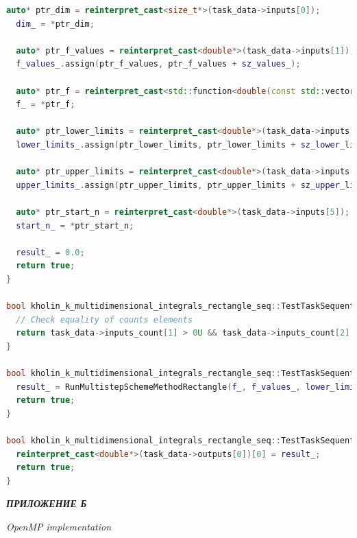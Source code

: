 \documentclass[14pt,a4paper]{article}
\begin{document}
\begin{framed}
\begin{lstlisting}[language=C++]
  auto* ptr_dim = reinterpret_cast<size_t*>(task_data->inputs[0]);
  dim_ = *ptr_dim;

  auto* ptr_f_values = reinterpret_cast<double*>(task_data->inputs[1]);
  f_values_.assign(ptr_f_values, ptr_f_values + sz_values_);

  auto* ptr_f = reinterpret_cast<std::function<double(const std::vector<double>&)>*>(task_data->inputs[2]);
  f_ = *ptr_f;

  auto* ptr_lower_limits = reinterpret_cast<double*>(task_data->inputs[3]);
  lower_limits_.assign(ptr_lower_limits, ptr_lower_limits + sz_lower_limits_);

  auto* ptr_upper_limits = reinterpret_cast<double*>(task_data->inputs[4]);
  upper_limits_.assign(ptr_upper_limits, ptr_upper_limits + sz_upper_limits_);

  auto* ptr_start_n = reinterpret_cast<double*>(task_data->inputs[5]);
  start_n_ = *ptr_start_n;

  result_ = 0.0;
  return true;
}

bool kholin_k_multidimensional_integrals_rectangle_seq::TestTaskSequential::ValidationImpl() {
  // Check equality of counts elements
  return task_data->inputs_count[1] > 0U && task_data->inputs_count[2] > 0U;
}

bool kholin_k_multidimensional_integrals_rectangle_seq::TestTaskSequential::RunImpl() {
  result_ = RunMultistepSchemeMethodRectangle(f_, f_values_, lower_limits_, upper_limits_, dim_, start_n_);
  return true;
}

bool kholin_k_multidimensional_integrals_rectangle_seq::TestTaskSequential::PostProcessingImpl() {
  reinterpret_cast<double*>(task_data->outputs[0])[0] = result_;
  return true;
}

\end{lstlisting}
\end{framed}


\newpage

{\raggedright\textit{\large\bfseries ПРИЛОЖЕНИЕ Б}\par}

\textit{OpenMP implementation}
\end{document}
